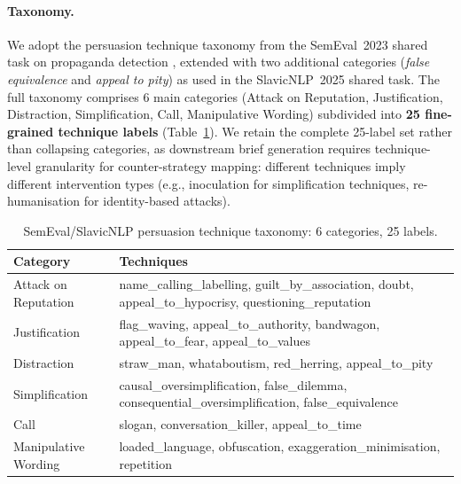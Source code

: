 \documentclass[10pt, a4paper]{article}
\begin{document}
\paragraph{Taxonomy.}
We adopt the persuasion technique taxonomy from the SemEval~2023 shared task on propaganda detection \citep{piskorski2023semeval}, extended with two additional categories (\textit{false equivalence} and \textit{appeal to pity}) as used in the SlavicNLP~2025 shared task. The full taxonomy comprises 6 main categories (Attack on Reputation, Justification, Distraction, Simplification, Call, Manipulative Wording) subdivided into \textbf{25 fine-grained technique labels} (Table~\ref{tab:taxonomy_categories}). We retain the complete 25-label set rather than collapsing categories, as downstream brief generation requires technique-level granularity for counter-strategy mapping: different techniques imply different intervention types (e.g., inoculation for simplification techniques, re-humanisation for identity-based attacks).

\begin{table}[h]
\centering
\small
\begin{tabular}{p{3.2cm}p{9.5cm}}
  \hline
  \textbf{Category} & \textbf{Techniques} \\
  \hline
  Attack on Reputation & name\_calling\_labelling, guilt\_by\_association, doubt, appeal\_to\_hypocrisy, questioning\_reputation \\
  Justification & flag\_waving, appeal\_to\_authority, bandwagon, appeal\_to\_fear, appeal\_to\_values \\
  Distraction & straw\_man, whataboutism, red\_herring, appeal\_to\_pity \\
  Simplification & causal\_oversimplification, false\_dilemma, consequential\_oversimplification, false\_equivalence \\
  Call & slogan, conversation\_killer, appeal\_to\_time \\
  Manipulative Wording & loaded\_language, obfuscation, exaggeration\_minimisation, repetition \\
  \hline
\end{tabular}
\caption{SemEval/SlavicNLP persuasion technique taxonomy: 6 categories, 25 labels.}
\label{tab:taxonomy_categories}
\end{table}
\end{document}
